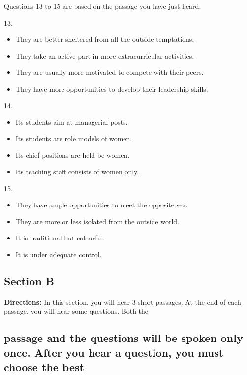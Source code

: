\documentclass[UTF8,11pt]{ctexart}
\begin{document}
Questions 13 to 15 are based on the passage you have just heard.


13.


\begin{itemize}[leftmargin=2em,itemsep=.2em,topsep=.4em]\item[A.] They are better sheltered from all the outside temptations.
\item[B.] They take an active part in more extracurricular activities.
\item[C.] They are usually more motivated to compete with their peers.
\item[D.] They have more opportunities to develop their leadership skills.
\end{itemize}

14.


\begin{itemize}[leftmargin=2em,itemsep=.2em,topsep=.4em]\item[A.] Its students aim at managerial posts.
\item[B.] Its students are role models of women.
\item[C.] Its chief positions are held be women.
\item[D.] Its teaching staff consists of women only.
\end{itemize}

15.


\begin{itemize}[leftmargin=2em,itemsep=.2em,topsep=.4em]\item[A.] They have ample opportunities to meet the opposite sex.
\item[B.] They are more or less isolated from the outside world.
\item[C.] It is traditional but colourful.
\item[D.] It is under adequate control.
\end{itemize}

\subsection*{\textbf{Section B}}


\textbf{Directions:} In this section, you will hear 3 short passages. At the end of each passage, you will hear some questions. Both the


\subsection*{passage and the questions will be spoken only once. After you hear a question, you must choose the best}
\end{document}
